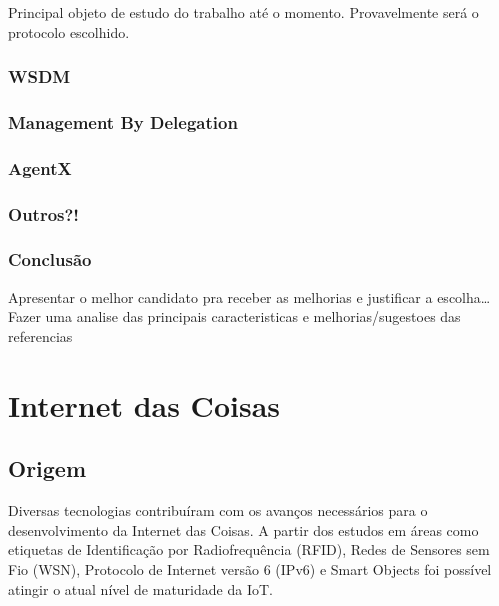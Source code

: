 \documentclass[twoside,english,brazilian]{UNISINOSmonografia}
\begin{document}
Principal objeto de estudo do trabalho até o momento.
Provavelmente será o protocolo escolhido.


\subsection{WSDM}


\subsection{Management By Delegation}


\subsection{AgentX}


\subsection{Outros?!}


\subsection{Conclusão}


Apresentar o melhor candidato pra receber as melhorias e justificar
a escolha\ldots
Fazer uma analise das principais caracteristicas e melhorias/sugestoes das 
referencias


\chapter{Internet das Coisas}


\section{Origem}

	Diversas tecnologias contribuíram com os avanços necessários para o 
	desenvolvimento da Internet das Coisas. A partir dos estudos em áreas como 
	etiquetas de Identificação por Radiofrequência (RFID), Redes de 
	Sensores sem Fio (WSN), Protocolo de Internet versão 6 (IPv6) e Smart 
	Objects foi possível atingir o atual nível de maturidade da IoT.

\end{document}
